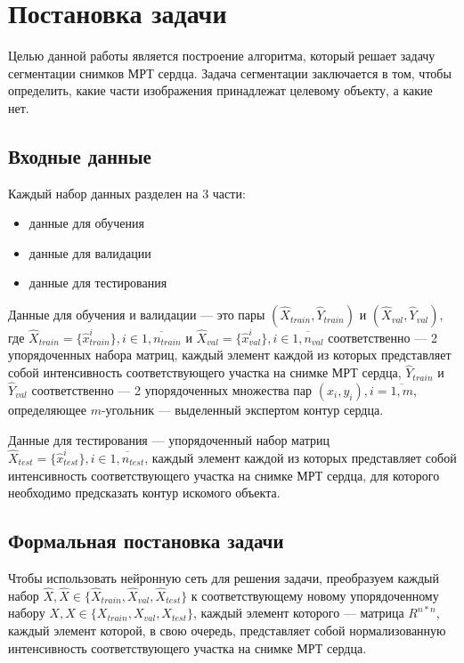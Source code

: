 \section{Постановка задачи}

Целью данной работы является построение алгоритма, который решает задачу сегментации снимков МРТ сердца. Задача сегментации заключается в том, чтобы определить, какие части изображения принадлежат целевому объекту, а какие нет. 

\subsection{Входные данные}

Каждый набор данных разделен на 3 части: 

\begin{itemize}
  \item данные для обучения
  \item данные для валидации
  \item данные для тестирования
\end{itemize}

Данные для обучения и валидации — это пары $(\hat{X}_{train},\hat{Y}_{train})$ и $(\hat{X}_{val},\hat{Y}_{val})$, где $\hat{X}_{train} = \{\hat{x}_{train}^{i}\}, i\in{}\overline{1,n_{train}}$ и $\hat{X}_{val} = \{\hat{x}_{val}^{i}\}, i\in{}\overline{1,n_{val}}$ соответственно — 2 упорядоченных набора матриц, каждый элемент каждой из которых представляет собой интенсивность соответствующего участка на снимке МРТ сердца, $\hat{Y}_{train}$ и $\hat{Y}_{val}$ соответственно — 2 упорядоченных множества пар $(x_{i},y_{i}), i = \overline{1,m}$, определяющее \mbox{$m$-угольник} — выделенный экспертом контур сердца.

Данные для тестирования — упорядоченный набор матриц $\hat{X}_{test} = \{\hat{x}_{test}^{i}\}, i\in{}\overline{1,n_{test}}$, каждый элемент каждой из которых представляет собой интенсивность соответствующего участка на снимке МРТ сердца, для которого необходимо предсказать контур искомого объекта.

\subsection{Формальная постановка задачи}

Чтобы использовать нейронную сеть для решения задачи, преобразуем каждый набор $\hat{X},\hat{X}\in{}\{\hat{X}_{train},\hat{X}_{val},\hat{X}_{test}\}$ к соответствующему новому упорядоченному набору $X,X\in{}\{X_{train},X_{val},X_{test}\}$, каждый элемент которого — матрица $R^{n*n}$, каждый элемент которой, в свою очередь, представляет собой нормализованную интенсивность соответствующего участка на снимке МРТ сердца. 

